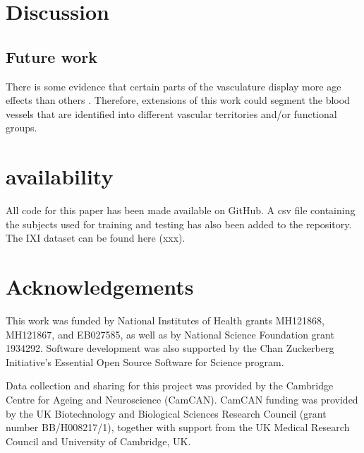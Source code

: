 \documentclass[pdflatex,sn-mathphys-num]{sn-jnl}
\begin{document}
\section{Discussion}

\subsection{Future work}

There is some evidence that certain parts of the vasculature display more age
effects than others \cite{Bullitt2010-ul}. Therefore, extensions of this work
could segment the blood vessels that are identified into different vascular
territories and/or functional groups.

\section{availability}

All code for this paper has been made available on GitHub. A csv file containing the subjects used for training and testing has also been added to the repository. The IXI dataset can be found here (xxx).


\section{Acknowledgements}

This work was funded by National Institutes of Health grants MH121868, MH121867, and EB027585, as well as by National Science Foundation grant 1934292. Software development was also supported by the Chan Zuckerberg Initiative's Essential Open Source Software for Science program.

Data collection and sharing for this project was provided by the Cambridge Centre for Ageing and Neuroscience (CamCAN). CamCAN funding was provided by the UK Biotechnology and Biological Sciences Research Council (grant number BB/H008217/1), together with support from the UK Medical Research Council and University of Cambridge, UK.


\end{document}

